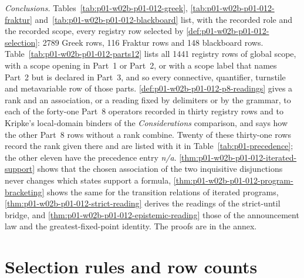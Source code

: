 \emph{Conclusions.}  Tables~\ref{tab:p01-w02b-p01-012-greek},
\ref{tab:p01-w02b-p01-012-fraktur} and~\ref{tab:p01-w02b-p01-012-blackboard}
list, with the recorded role and the recorded scope, every registry row
selected by \cref{def:p01-w02b-p01-012-selection}: 2789 Greek
rows, 116 Fraktur rows and 148 blackboard
rows.  Table~\ref{tab:p01-w02b-p01-012-parts12} lists all 1441
registry rows of global scope, with a scope opening in Part~1 or Part~2, or
with a scope label that names Part~2 but is declared in Part~3, and so
every connective, quantifier, turnstile and metavariable row of
those parts.  \cref{def:p01-w02b-p01-012-p8-readings} gives a rank and an
association, or a reading fixed by delimiters or by the grammar, to each of
the forty-one Part~8 operators recorded in thirty registry rows and to
Kripke's local-domain binders of the \emph{Considerations} comparison, and
says how the other Part~8 rows without a rank combine.  Twenty of these
thirty-one rows record the rank given there and are listed with it in
Table~\ref{tab:p01-precedence}; the other eleven have the precedence entry
\emph{n/a}.
\cref{thm:p01-w02b-p01-012-iterated-support} shows that the chosen
association of the two inquisitive disjunctions never changes which states
support a formula, \cref{thm:p01-w02b-p01-012-program-bracketing} shows the
same for the transition relations of iterated programs,
\cref{thm:p01-w02b-p01-012-strict-reading} derives the readings of the
strict-until bridge, and \cref{thm:p01-w02b-p01-012-epistemic-reading}
those of the announcement law and the greatest-fixed-point identity.  The proofs are in the annex.

\section{Selection rules and row counts}
\label{sec:p01-w02b-p01-012-selection}

